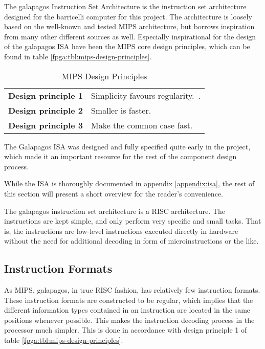 The \Gls{galapagos} Instruction Set Architecture is the instruction set architecture designed for the \Gls{barricelli} computer for this project.
The architecture is loosely based on the well-known and tested \gls{MIPS} architecture, but borrows inspiration from many other different sources as well.
Especially inspirational for the design of the \Gls{galapagos} ISA have been the \gls{MIPS} core design principles, which can be found in table \vref{fpga:tbl:mips-design-principles}.

\begin{table}[H]
\centering
    \begin{tabular}{l l} 
     \textbf{Design principle 1} & Simplicity favours regularity.~\cite[p.~79]{compOrgDes}. \\
     \textbf{Design principle 2} & Smaller is faster.~\cite[p.~81]{compOrgDes} \\
     \textbf{Design principle 3} & Make the common case fast.~\cite[p.~86]{compOrgDes} \\
    \hline
\end{tabular}
    \caption{MIPS Design Principles}
    \label{fpga:tbl:mips-design-principles}
\end{table}

The Galapagos ISA was designed and fully specified quite early in the project, which made it an important resource for the rest of the component design process.

While the ISA is thoroughly documented in appendix \vref{appendix:isa}, the rest of this section will present a short overview for the reader's convenience.

\bigskip
\bigskip

The \Gls{galapagos} instruction set architecture is a RISC architecture.
The instructions are kept simple, and only perform very specific and small tasks.
That is, the instructions are low-level instructions executed directly in hardware without the need for additional decoding in form of microinstructions or the like.

\subsection{Instruction Formats}

As \Gls{MIPS}, \Gls{galapagos}, in true \gls{RISC} fashion, has relatively few instruction formats.
These instruction formats are constructed to be regular, which implies that the different information types contained in an instruction are located in the same positions whenever possible.
This makes the instruction decoding process in the processor much simpler.
This is done in accordance with design principle 1 of table \vref{fpga:tbl:mips-design-principles}.

